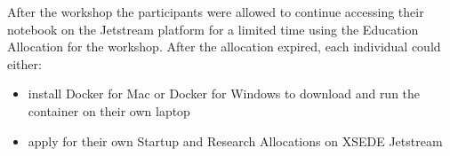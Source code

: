 After the workshop the participants were allowed to continue accessing their
notebook on the Jetstream platform for a limited time using the Education
Allocation for the workshop. After the allocation expired, each individual could
either:

\begin{itemize}

\item install Docker for Mac or Docker for Windows to download and run the
container on their own laptop

\item apply for their own Startup and Research Allocations on XSEDE Jetstream

\end{itemize}
